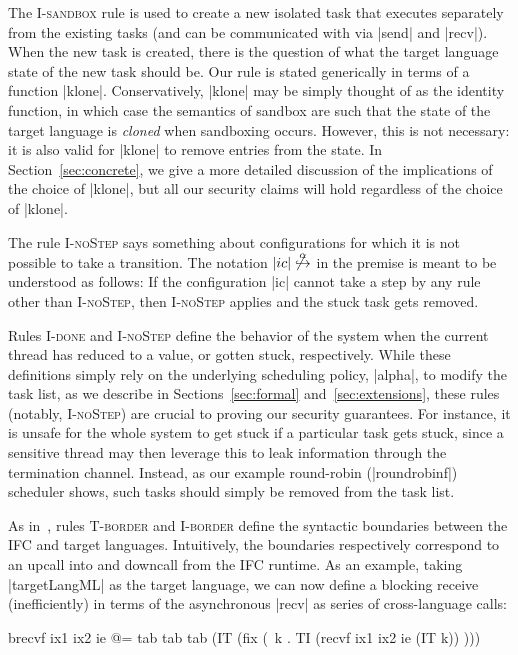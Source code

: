 The \textsc{I-sandbox} rule is used to create a new isolated task that
executes separately from the existing tasks (and can be communicated
with via |send| and |recv|).  When the new task is created, there
is the question of what the target language state of the new task should
be.  Our rule is stated generically in terms of a function |klone|.
Conservatively, |klone| may be simply thought of as the identity
function, in which
case the semantics of sandbox are such that the state of the target language is \emph{cloned}
when sandboxing occurs.  However, this is not necessary: it is also valid for |klone|
to remove entries from the state.  In Section~\ref{sec:concrete}, we give a more detailed
discussion of the implications of the choice of |klone|, but all our
security claims will hold regardless of the choice of |klone|.

The rule \textsc{I-noStep} says something about configurations for which
it is not possible to take a transition.  The notation
$|ic|\not\overset{\alpha}{\hookrightarrow}$ in the premise
is meant to be understood as
follows:  If the configuration |ic| cannot take a step by any rule other
than \textsc{I-noStep}, then \textsc{I-noStep} applies and the
stuck task gets removed.

Rules \textsc{I-done} and \textsc{I-noStep} define the behavior of the system
when the current thread has reduced to a value, or gotten stuck, respectively.
%
While these definitions simply rely on the underlying scheduling policy,
|alpha|, to modify the task list, as we describe in Sections~\ref{sec:formal}
and~\ref{sec:extensions}, these rules (notably, \textsc{I-noStep}) are crucial
to proving our security guarantees.
%
For instance, it is unsafe for the whole system to get stuck if a particular
task gets stuck, since a sensitive thread may then leverage this to leak
information through the termination channel.
%
Instead, as our example round-robin (|roundrobinf|) scheduler shows,
such tasks should simply be removed from the task list.

%
As in~\cite{Matthews:2007:OSM:1190216.1190220}, rules \textsc{T-border} and
\textsc{I-border} define the syntactic boundaries between the IFC and target
languages.
%
Intuitively, the boundaries respectively correspond to an upcall into and
downcall from the IFC runtime.
%
As an example, taking |targetLangML| as the target language, we can now define a
blocking receive (inefficiently) in terms of the asynchronous |recv| as series
of cross-language calls:
\begin{code}
  brecvf ix1 ix2 ie @=
  tab tab tab (IT (fix (\ k . TI (recvf ix1 ix2 ie (IT k)) )))
\end{code}


